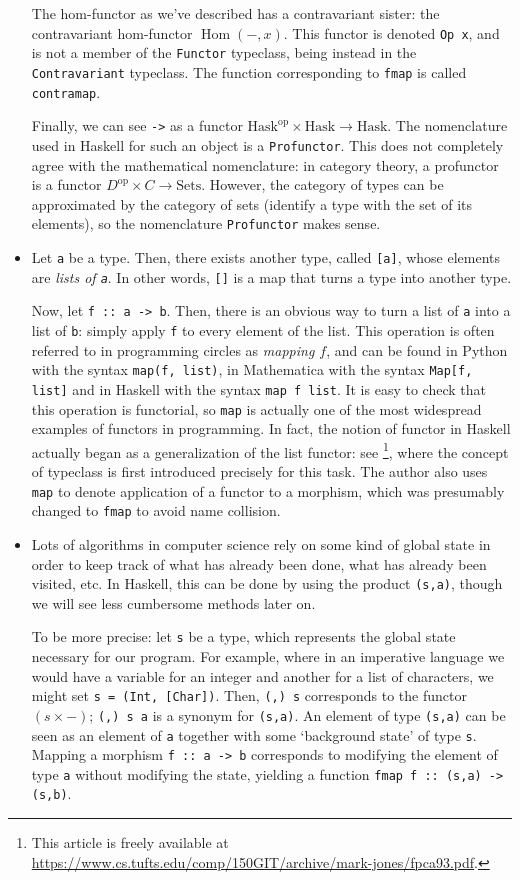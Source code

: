 \documentclass[11pt]{article}
\theoremstyle{nonumberplain}
\newcommand{\Hask}{\mathrm{Hask}}
\newcommand{\cat}[1]{\mathrm{#1}}
\newcommand{\blank}{{-}}
\newcommand{\op}{\mathrm{op}}
\DeclareMathOperator{\Hom}{Hom}
\newcommand*\lsin{\lstinline}
\begin{document}
\begin{itemize}
The hom-functor as we've described has a contravariant sister: the contravariant hom-functor $\Hom(\blank, x)$. This functor is denoted \lsin|Op x|, and is not a member of the \lsin|Functor| typeclass, being instead in the \lsin|Contravariant| typeclass. The function corresponding to \lsin|fmap| is called \lsin|contramap|.

Finally, we can see \lsin|->| as a functor $\Hask^\op \times \Hask \to \Hask$. The nomenclature used in Haskell for such an object is a \lsin|Profunctor|. This does not completely agree with the mathematical nomenclature: in category theory, a profunctor is a functor $D^\op \times C \to \cat{Sets}$. However, the category of types can be approximated by the category of sets (identify a type with the set of its elements), so the nomenclature \lsin|Profunctor| makes sense.

\item Let \lsin|a| be a type. Then, there exists another type, called \lsin|[a]|, whose elements are \emph{lists of \lsin|a|}. In other words, \lsin|[]| is a map that turns a type into another type.

Now, let \lsin|f :: a -> b|. Then, there is an obvious way to turn a list of \lsin|a| into a list of \lsin|b|: simply apply \lsin|f| to every element of the list. This operation is often referred to in programming circles as \emph{mapping $f$}, and can be found in Python with the syntax \lsin|map(f, list)|, in Mathematica with the syntax \lsin|Map[f, list]| and in Haskell with the syntax \lsin|map f list|. It is easy to check that this operation is functorial, so \lsin|map| is actually one of the most widespread examples of functors in programming. In fact, the notion of functor in Haskell actually began as a generalization of the list functor: see \cite{markjones}\footnote{This article is freely available at \url{https://www.cs.tufts.edu/comp/150GIT/archive/mark-jones/fpca93.pdf}.}, where the concept of typeclass is first introduced precisely for this task. The author also uses \lsin|map| to denote application of a functor to a morphism, which was presumably changed to \lsin|fmap| to avoid name collision.

\item Lots of algorithms in computer science rely on some kind of global state in order to keep track of what has already been done, what has already been visited, etc. In Haskell, this can be done by using the product \lsin|(s,a)|, though we will see less cumbersome methods later on.

To be more precise: let \lsin|s| be a type, which represents the global state necessary for our program. For example, where in an imperative language we would have a variable for an integer and another for a list of characters, we might set \lsin|s = (Int, [Char])|. Then, \lsin|(,) s| corresponds to the functor $(s \times \blank)$; \lsin|(,) s a| is a synonym for \lsin|(s,a)|. An element of type \lsin|(s,a)| can be seen as an element of \lsin|a| together with some `background state' of type \lsin|s|. Mapping a morphism \lsin|f :: a -> b| corresponds to modifying the element of type \lsin|a| without modifying the state, yielding a function \lsin|fmap f :: (s,a) -> (s,b)|.
\end{itemize}
\end{document}
